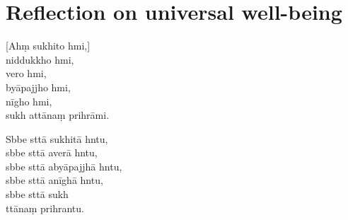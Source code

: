 %
%

\clearpage

\chapter[Universal well-being]{Reflection on universal well-being}                       %

\begin{leader}
\end{leader}

[Ahṃ sukhito hmi,]\\
niddukkho hmi,\\
vero hmi,\\
byāpajjho hmi,\\
nīgho hmi,\\
sukh attānaṃ prihrāmi.

Sbbe sttā sukhitā hntu,\\
sbbe sttā averā hntu,\\
sbbe sttā abyāpajjhā hntu,\\
sbbe sttā anīghā hntu,\\
sbbe sttā sukh\\
ttānaṃ prihrantu.

